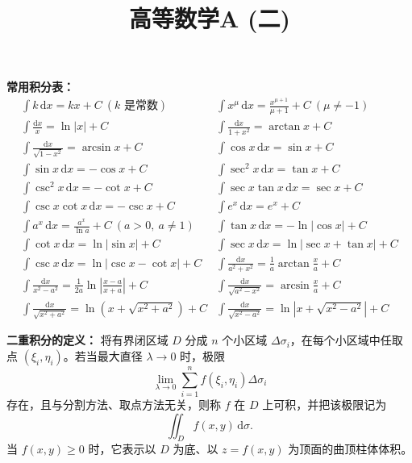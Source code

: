 \documentclass[answer,fontset=fandol]{THUExam}
\title{高等数学A (二)}
\author{}
\begin{document}
\vspace{1cm}
\makehead

\begin{note}
\textbf{常用积分表：}
\[
\begin{array}{ll}
\displaystyle\int k\,\mathrm{d}x=kx+C\ (k\text{ 是常数})&
\displaystyle\int x^\mu\,\mathrm{d}x=\frac{x^{\mu+1}}{\mu+1}+C\ (\mu\neq-1)\\[8pt]
\displaystyle\int\frac{\mathrm{d}x}{x}=\ln|x|+C&
\displaystyle\int\frac{\mathrm{d}x}{1+x^2}=\arctan x+C\\[8pt]
\displaystyle\int\frac{\mathrm{d}x}{\sqrt{1-x^2}}=\arcsin x+C&
\displaystyle\int\cos x\,\mathrm{d}x=\sin x+C\\[8pt]
\displaystyle\int\sin x\,\mathrm{d}x=-\cos x+C&
\displaystyle\int\sec^2x\,\mathrm{d}x=\tan x+C\\[8pt]
\displaystyle\int\csc^2x\,\mathrm{d}x=-\cot x+C&
\displaystyle\int\sec x\tan x\,\mathrm{d}x=\sec x+C\\[8pt]
\displaystyle\int\csc x\cot x\,\mathrm{d}x=-\csc x+C&
\displaystyle\int e^x\,\mathrm{d}x=e^x+C\\[8pt]
\displaystyle\int a^x\,\mathrm{d}x=\frac{a^x}{\ln a}+C\ (a>0,\ a\neq1)&
\displaystyle\int\tan x\,\mathrm{d}x=-\ln|\cos x|+C\\[8pt]
\displaystyle\int\cot x\,\mathrm{d}x=\ln|\sin x|+C&
\displaystyle\int\sec x\,\mathrm{d}x=\ln|\sec x+\tan x|+C\\[8pt]
\displaystyle\int\csc x\,\mathrm{d}x=\ln|\csc x-\cot x|+C&
\displaystyle\int\frac{\mathrm{d}x}{a^2+x^2}=\frac1a\arctan\frac{x}{a}+C\\[8pt]
\displaystyle\int\frac{\mathrm{d}x}{x^2-a^2}=\frac{1}{2a}\ln\left|\frac{x-a}{x+a}\right|+C&
\displaystyle\int\frac{\mathrm{d}x}{\sqrt{a^2-x^2}}=\arcsin\frac{x}{a}+C\\[8pt]
\displaystyle\int\frac{\mathrm{d}x}{\sqrt{x^2+a^2}}=\ln\left(x+\sqrt{x^2+a^2}\right)+C&
\displaystyle\int\frac{\mathrm{d}x}{\sqrt{x^2-a^2}}=\ln\left|x+\sqrt{x^2-a^2}\right|+C
\end{array}
\]
\end{note}
\bigskip


\begin{note}
\textbf{二重积分的定义：} 将有界闭区域 $D$ 分成 $n$ 个小区域 $\Delta\sigma_i$，在每个小区域中任取点 $(\xi_i,\eta_i)$。若当最大直径 $\lambda\to0$ 时，极限
\[
\lim_{\lambda\to0}\sum_{i=1}^n f(\xi_i,\eta_i)\Delta\sigma_i
\]
存在，且与分割方法、取点方法无关，则称 $f$ 在 $D$ 上可积，并把该极限记为
\[
\iint_D f(x,y)\,\mathrm{d}\sigma.
\]
当 $f(x,y)\geqslant0$ 时，它表示以 $D$ 为底、以 $z=f(x,y)$ 为顶面的曲顶柱体体积。
\end{note}
\bigskip
\end{document}
